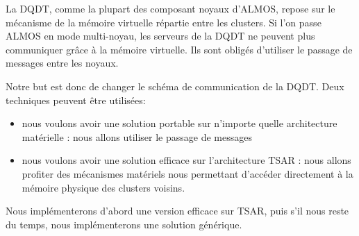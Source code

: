     La DQDT, comme la plupart des composant noyaux d'ALMOS, repose sur le
    mécanisme de la mémoire virtuelle répartie entre les clusters. Si l'on passe
    ALMOS en mode multi-noyau, les serveurs de la DQDT ne peuvent plus
    communiquer grâce à la mémoire virtuelle. Ils sont obligés d'utiliser le
    passage de messages entre les noyaux.

    Notre but est donc de changer le schéma de communication de la DQDT. Deux
    techniques peuvent être utilisées:
    \begin{itemize}
      \item nous voulons avoir une solution portable sur n'importe quelle
        architecture matérielle : nous allons utiliser le passage de messages
      \item nous voulons avoir une solution efficace sur l'architecture TSAR :
        nous allons profiter des mécanismes matériels nous permettant d'accéder
        directement à la mémoire physique des clusters voisins.
    \end{itemize}

    Nous implémenterons d'abord une version efficace sur TSAR, puis s'il nous
    reste du temps, nous implémenterons une solution générique.
